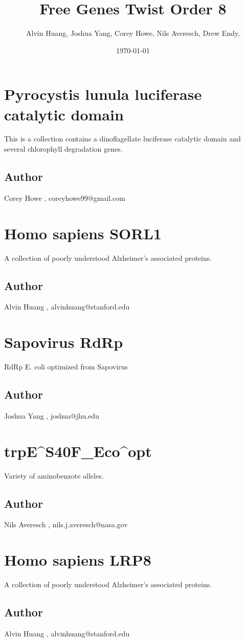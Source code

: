 \documentclass{article}%
\title{Free Genes Twist Order 8}%
\author{Alvin Huang, Joshua Yang, Corey Howe, Nils Averesch, Drew Endy, }%
\date{\today}%
\begin{document}
%
\normalsize%
\maketitle%
\section{Pyrocystis lunula luciferase catalytic domain}%
This is a collection contains a dinoflagellate  luciferase catalytic domain and several chlorophyll degradation genes.%
\subsection{Author}%
Corey Howe%
,%
coreyhowe99@gmail.com

%
\section{Homo sapiens SORL1}%
A collection of poorly understood Alzheimer's associated proteins.%
\subsection{Author}%
Alvin Huang%
,%
alvinhuang@stanford.edu

%
\section{Sapovirus RdRp}%
RdRp E. coli optimized from Sapovirus%
\subsection{Author}%
Joshua Yang%
,%
joshua@jhu.edu

%
\section{trpE\^{}S40F\_Eco\^{}opt}%
Variety of aminobenzote alleles. %
\subsection{Author}%
Nils Averesch%
,%
nils.j.averesch@nasa.gov

%
\section{Homo sapiens LRP8}%
A collection of poorly understood Alzheimer's associated proteins.%
\subsection{Author}%
Alvin Huang%
,%
alvinhuang@stanford.edu
\end{document}
